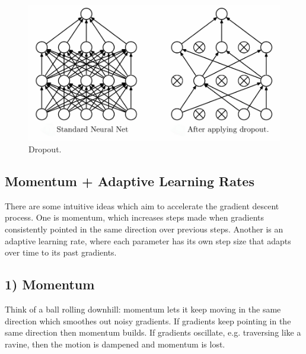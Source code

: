 \documentclass[11pt]{article}
\begin{document}
\begin{figure}[t]
    \centering
    \includegraphics[width=\textwidth]{./figures/neural_nets/REG_dropout.pdf}
    \caption{Dropout.}
    \label{fig:dropout}
\end{figure}

\subsection{Momentum + Adaptive Learning Rates}
There are some intuitive ideas which aim to accelerate the gradient descent process. One is momentum, which increases steps made when gradients consistently pointed in the same direction over previous steps. Another is an adaptive learning rate, where each parameter has its own step size that adapts over time to its past gradients.

\subsection*{1) Momentum}
Think of a ball rolling downhill: momentum lets it keep moving in the same direction which smoothes out noisy gradients. If gradients keep pointing in the same direction then momentum builds. If gradients oscillate, e.g. traversing like a ravine, then the motion is dampened and momentum is lost.
\end{document}
